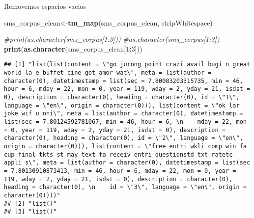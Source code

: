 \documentclass[]{article}
\newenvironment{Shaded}{\begin{snugshade}}{\end{snugshade}}
\newcommand{\KeywordTok}[1]{\textcolor[rgb]{0.13,0.29,0.53}{\textbf{#1}}}
\newcommand{\DecValTok}[1]{\textcolor[rgb]{0.00,0.00,0.81}{#1}}
\newcommand{\CommentTok}[1]{\textcolor[rgb]{0.56,0.35,0.01}{\textit{#1}}}
\newcommand{\OperatorTok}[1]{\textcolor[rgb]{0.81,0.36,0.00}{\textbf{#1}}}
\newcommand{\NormalTok}[1]{#1}
\begin{document}
Removemos espacios vacios

\begin{Shaded}
\begin{Highlighting}[]
\NormalTok{sms_corpus_clean<-}\KeywordTok{tm_map}\NormalTok{(sms_corpus_clean, stripWhitespace)}

\CommentTok{#print(as.character(sms_corpus[1:3]))}
\CommentTok{#as.character(sms_corpus[1:3])}
\KeywordTok{print}\NormalTok{(}\KeywordTok{as.character}\NormalTok{(sms_corpus_clean[}\DecValTok{1}\OperatorTok{:}\DecValTok{3}\NormalTok{]))}
\end{Highlighting}
\end{Shaded}

\begin{verbatim}
## [1] "list(list(content = \"go jurong point crazi avail bugi n great world la e buffet cine got amor wat\", meta = list(author = character(0), datetimestamp = list(sec = 7.80083203315735, min = 46, hour = 6, mday = 22, mon = 0, year = 119, wday = 2, yday = 21, isdst = 0), description = character(0), heading = character(0), id = \"1\", language = \"en\", origin = character(0))), list(content = \"ok lar joke wif u oni\", meta = list(author = character(0), datetimestamp = list(sec = 7.80124592781067, min = 46, hour = 6, \n    mday = 22, mon = 0, year = 119, wday = 2, yday = 21, isdst = 0), description = character(0), heading = character(0), id = \"2\", language = \"en\", origin = character(0))), list(content = \"free entri wkli comp win fa cup final tkts st may text fa receiv entri questionstd txt ratetc appli s\", meta = list(author = character(0), datetimestamp = list(sec = 7.80130910873413, min = 46, hour = 6, mday = 22, mon = 0, year = 119, wday = 2, yday = 21, isdst = 0), description = character(0), heading = character(0), \n    id = \"3\", language = \"en\", origin = character(0))))"
## [2] "list()"                                                                                                                                                                                                                                                                                                                                                                                                                                                                                                                                                                                                                                                                                                                                                                                                                                                                                                                                                                                                                                                                                                                                  
## [3] "list()"
\end{verbatim}
\end{document}
